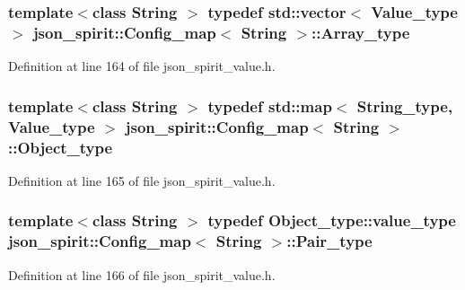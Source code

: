 \subsubsection[{Array\+\_\+type}]{\setlength{\rightskip}{0pt plus 5cm}template$<$class String $>$ typedef std\+::vector$<$ {\bf Value\+\_\+type} $>$ {\bf json\+\_\+spirit\+::\+Config\+\_\+map}$<$ String $>$\+::{\bf Array\+\_\+type}}\label{structjson__spirit_1_1_config__map_a2efd6f753201c1c08c30d96e27c192d7}


Definition at line 164 of file json\+\_\+spirit\+\_\+value.\+h.

\hypertarget{structjson__spirit_1_1_config__map_a64fd50a8a903e22e3909e83244a0c92f}{}
\subsubsection[{Object\+\_\+type}]{\setlength{\rightskip}{0pt plus 5cm}template$<$class String $>$ typedef std\+::map$<$ {\bf String\+\_\+type}, {\bf Value\+\_\+type} $>$ {\bf json\+\_\+spirit\+::\+Config\+\_\+map}$<$ String $>$\+::{\bf Object\+\_\+type}}\label{structjson__spirit_1_1_config__map_a64fd50a8a903e22e3909e83244a0c92f}


Definition at line 165 of file json\+\_\+spirit\+\_\+value.\+h.

\hypertarget{structjson__spirit_1_1_config__map_a2fe4847e01358c060b7a20cfce43305c}{}
\subsubsection[{Pair\+\_\+type}]{\setlength{\rightskip}{0pt plus 5cm}template$<$class String $>$ typedef Object\+\_\+type\+::value\+\_\+type {\bf json\+\_\+spirit\+::\+Config\+\_\+map}$<$ String $>$\+::{\bf Pair\+\_\+type}}\label{structjson__spirit_1_1_config__map_a2fe4847e01358c060b7a20cfce43305c}


Definition at line 166 of file json\+\_\+spirit\+\_\+value.\+h.

\hypertarget{structjson__spirit_1_1_config__map_abcfbacb1047e017b281210332f574b87}{}
